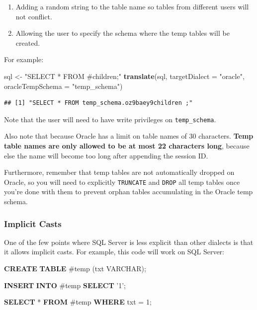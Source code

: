 \documentclass[11pt]{book}
\newenvironment{Shaded}{\begin{snugshade}}{\end{snugshade}}
\newcommand{\KeywordTok}[1]{\textcolor[rgb]{0.13,0.29,0.53}{\textbf{#1}}}
\newcommand{\DataTypeTok}[1]{\textcolor[rgb]{0.13,0.29,0.53}{#1}}
\newcommand{\DecValTok}[1]{\textcolor[rgb]{0.00,0.00,0.81}{#1}}
\newcommand{\StringTok}[1]{\textcolor[rgb]{0.31,0.60,0.02}{#1}}
\newcommand{\NormalTok}[1]{#1}
\providecommand{\tightlist}{%
  \setlength{\itemsep}{0pt}\setlength{\parskip}{0pt}}
\theoremstyle{definition}
\theoremstyle{definition}
\theoremstyle{definition}
\theoremstyle{remark}
\begin{document}
\begin{enumerate}
\def\labelenumi{\arabic{enumi}.}
\tightlist
\item
  Adding a random string to the table name so tables from different
  users will not conflict.
\item
  Allowing the user to specify the schema where the temp tables will be
  created.
\end{enumerate}

For example:

\begin{Shaded}
\begin{Highlighting}[]
\NormalTok{sql <-}\StringTok{ "SELECT * FROM #children;"}
\KeywordTok{translate}\NormalTok{(sql, }\DataTypeTok{targetDialect =} \StringTok{"oracle"}\NormalTok{, }\DataTypeTok{oracleTempSchema =} \StringTok{"temp_schema"}\NormalTok{)}
\end{Highlighting}
\end{Shaded}

\begin{verbatim}
## [1] "SELECT * FROM temp_schema.oz9baey9children ;"
\end{verbatim}

Note that the user will need to have write privileges on
\texttt{temp\_schema}.

Also note that because Oracle has a limit on table names of 30
characters. \textbf{Temp table names are only allowed to be at most 22
characters long}, because else the name will become too long after
appending the session ID.

Furthermore, remember that temp tables are not automatically dropped on
Oracle, so you will need to explicitly \texttt{TRUNCATE} and
\texttt{DROP} all temp tables once you're done with them to prevent
orphan tables accumulating in the Oracle temp schema.

\subsubsection*{Implicit Casts}\label{implicit-casts}

One of the few points where SQL Server is less explicit than other
dialects is that it allows implicit casts. For example, this code will
work on SQL Server:

\begin{Shaded}
\begin{Highlighting}[]
\KeywordTok{CREATE} \KeywordTok{TABLE}\NormalTok{ #temp (txt }\DataTypeTok{VARCHAR}\NormalTok{);}

\KeywordTok{INSERT} \KeywordTok{INTO}\NormalTok{ #temp}
\KeywordTok{SELECT} \StringTok{'1'}\NormalTok{;}

\KeywordTok{SELECT}\NormalTok{ * }\KeywordTok{FROM}\NormalTok{ #temp }\KeywordTok{WHERE}\NormalTok{ txt = }\DecValTok{1}\NormalTok{;}
\end{Highlighting}
\end{Shaded}
\end{document}

